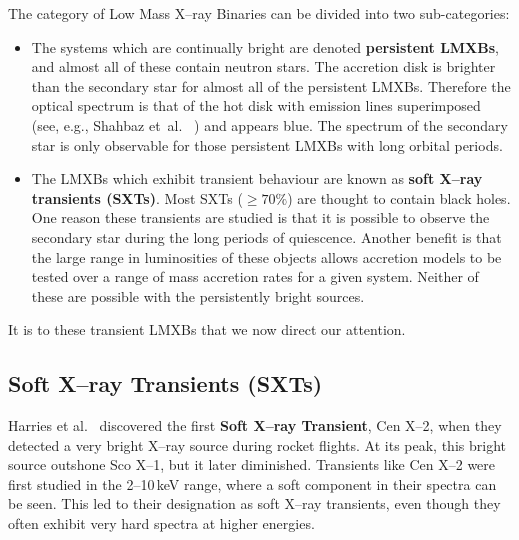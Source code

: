 \vspace{\myparskip}

The category of Low Mass X--ray Binaries can be divided into two
sub-categories:

\begin{itemize}
\item %
The systems which are continually bright are denoted
\textbf{persistent LMXBs}, and almost all of these contain neutron stars. %
The accretion disk is brighter than the secondary star for almost all of the persistent
LMXBs. Therefore the optical spectrum is that of the hot disk with emission lines superimposed (see, e.g., Shahbaz et~al.\ %
%
) and appears blue. The spectrum of the secondary star is only
observable for those persistent LMXBs with long orbital periods. %

\item %
The LMXBs which exhibit transient behaviour are known as \textbf{soft
X--ray transients (SXTs)}. Most SXTs ($\geq 70\%$) are thought to contain black holes.
One reason these transients are studied is that it is possible to observe the secondary star during the long periods of quiescence. Another benefit is that the large range in
luminosities of these objects allows accretion models to be tested
over a range of mass accretion rates for a given system. Neither of these are possible with the persistently bright sources. %


\end{itemize}
It is to these transient LMXBs that we now direct our attention. %



\subsection{Soft X--ray Transients (SXTs)}
\label{cha:Introduction:sec:X--rayBinaries:subsec:SXTs}

Harries et al.\ %
\citeyear{Harries_et_al.:1967} %
discovered the first \textbf{Soft X--ray Transient}, %
Cen X--2, when they detected a very bright X--ray source %
during rocket flights. %
At its peak, this bright source outshone Sco X--1, but it later
diminished. Transients like Cen X--2 were first studied in the 2--10\,keV range, where a
soft component in their spectra can be seen. This led to their
designation as soft X--ray transients, even though they often exhibit
very hard spectra at higher energies. %

